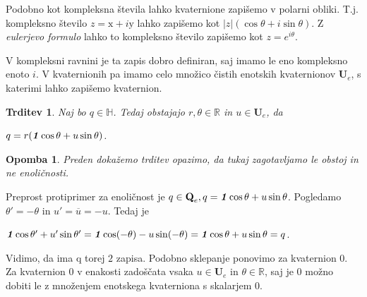 \documentclass[a4paper,12pt]{article}
\def\R{\mathbb{R}} %
\def\H{\mathbb{H}} %
\def\Qe{\textbf{Q}_{e}} %
\def\Ue{\textbf{U}_{e}} %
\def\1{\textbf{\emph{1}}}
\newcommand{\conj}[1]{\overline{#1}}
\newtheorem{trditev}{Trditev}
\newtheorem{opomba}{Opomba}
\begin{document}
Podobno kot kompleksna števila lahko kvaternione zapišemo v polarni obliki. T.j.
kompleksno število $z = \text{x} + i\text{y}$ lahko zapišemo kot $|z|( \cos\theta + i\sin\theta )$. Z \emph{eulerjevo formulo} lahko to kompleksno število
zapišemo kot $z = e^{i\theta}$.

V kompleksni ravnini je ta zapis dobro definiran, saj imamo le eno kompleksno enoto $i$.
V kvaternionih pa imamo celo množico čistih enotskih kvaternionov $\Ue$, s katerimi lahko zapišemo kvaternion.

\begin{trditev}
Naj bo $q \in \H$. Tedaj obstajajo $r, \theta \in \R$ in $u \in \Ue$, da
\begin{center}
   $q = r (\1\cos\theta + u\sin\theta)$.
\end{center}
\end{trditev}

\begin{opomba}
Preden dokažemo trditev opazimo, da tukaj zagotavljamo \emph{le obstoj} in ne enoličnosti.

\end{opomba}
Preprost protiprimer za enoličnost je $q \in \Qe, q = \1\cos\theta + u\sin\theta$.
Pogledamo $\theta' = -\theta$ in $u' = \conj{u} = -u$. Tedaj je
\begin{center}
   $\1\cos\theta' + u'\sin\theta' = \1\cos(-\theta) -u\sin(-\theta) = \1\cos\theta + u\sin\theta = q$.
\end{center}
Vidimo, da ima q torej $2$ zapisa. Podobno sklepanje ponovimo za kvaternion 0. Za kvaternion 0 v enakosti zadoščata vsaka $u \in \Ue$ in $\theta \in \R$, saj je 0 možno dobiti le z množenjem enotskega kvaterniona
s skalarjem 0.




\end{document}
